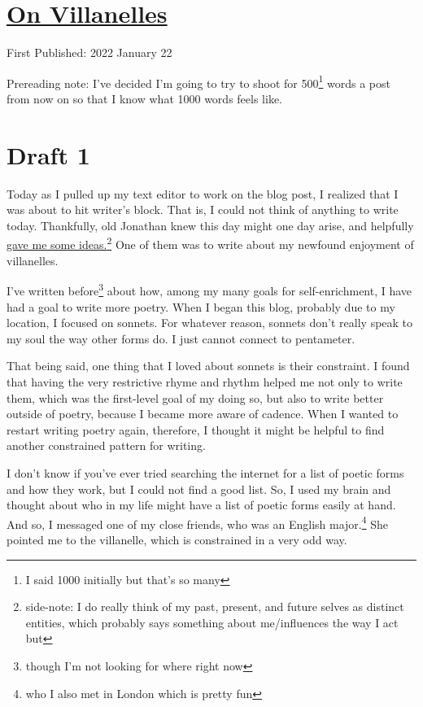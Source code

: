 \documentclass[12pt]{article}[titlepage]
\newcommand{\1}{\={a}}
\newcommand{\2}{\={e}}
\newcommand{\3}{\={\i}}
\newcommand{\4}{\=o}
\newcommand{\5}{\=u}
\newcommand{\6}{\={A}}
\renewcommand{\,}{\textsuperscript{,}}
\begin{document}
\doublespacing
\section{\href{on-villanelles.html}{On Villanelles}}
First Published: 2022 January 22

Prereading note: I've decided I'm going to try to shoot for 500\footnote{I said 1000 initially but that's so many} words a post from now on so that I know what 1000 words feels like.

\section{Draft 1}
Today as I pulled up my text editor to work on the blog post, I realized that I was about to hit writer's block.
That is, I could not think of anything to write today.
Thankfully, old Jonathan knew this day might one day arise, and helpfully \href{restarting.html}{gave me some ideas.}\footnote{side-note: I do really think of my past, present, and future selves as distinct entities, which probably says something about me/influences the way I act but}
One of them was to write about my newfound enjoyment of villanelles.

I've written before\footnote{though I'm not looking for where right now} about how, among my many goals for self-enrichment, I have had a goal to write more poetry.
When I began this blog, probably due to my location, I focused on sonnets.
For whatever reason, sonnets don't really speak to my soul the way other forms do.
I just cannot connect to pentameter.

That being said, one thing that I loved about sonnets is their constraint.
I found that having the very restrictive rhyme and rhythm helped me not only to write them, which was the first-level goal of my doing so, but also to write better outside of poetry, because I became more aware of cadence.
When I wanted to restart writing poetry again, therefore, I thought it might be helpful to find another constrained pattern for writing.

I don't know if you've ever tried searching the internet for a list of poetic forms and how they work, but I could not find a good list.
So, I used my brain and thought about who in my life might have a list of poetic forms easily at hand.
And so, I messaged one of my close friends, who was an English major.\footnote{who I also met in London which is pretty fun}
She pointed me to the villanelle, which is constrained in a very odd way.
\end{document}
